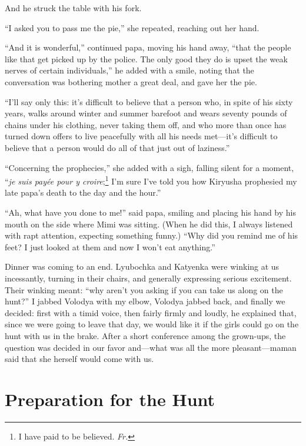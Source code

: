 And he struck the table with his fork.

``I asked you to pass me the pie,'' she repeated, reaching out her hand.

``And it is wonderful,'' continued papa, moving his hand away, ``that the people like that get picked up by the police. The only good they do is upset the weak nerves of certain individuals,'' he added with a smile, noting that the conversation was bothering mother a great deal, and gave her the pie.

``I'll say only this: it's difficult to believe that a person who, in spite of his sixty years, walks around winter and summer barefoot and wears seventy pounds of chains under his clothing, never taking them off, and who more than once has turned down offers to live peacefully with all his needs met---it's difficult to believe that a person would do all of that just out of laziness.'' %

``Concerning the prophecies,'' she added with a sigh, falling silent for a moment, ``\textit{je suis pay\'ee pour y croire};\footnote{I have paid to be believed. \textit{Fr.}}  I'm sure I've told you how Kiryusha prophesied my late papa's death to the day and the hour.'' %

``Ah, what have you done to me!'' said papa, smiling and placing his hand by his mouth on the side where Mimi was sitting. (When he did this, I always listened with rapt attention, expecting something funny.) ``Why did you remind me of his feet? I just looked at them and now I won't eat anything.'' %

Dinner was coming to an end. Lyubochka and Katyenka were winking at us incessantly, turning in their chairs, and generally expressing serious excitement. Their winking meant: ``why aren't you asking if you can take us along on the hunt?'' I jabbed Volodya with my elbow, Volodya jabbed back, and finally we decided: first with a timid voice, then fairly firmly and loudly, he explained that, since we were going to leave that day, we would like it if the girls could go on the hunt with us in the brake.  After a short conference among the grown-ups, the question was decided in our favor and---what was all the more pleasant---maman said that she herself would come with us.

\chapter{Preparation for the Hunt} %

